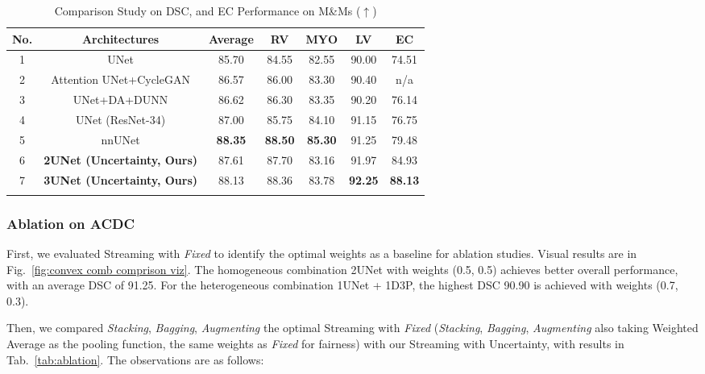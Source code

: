 \begin{table}[htb!]
\caption{Comparison Study on DSC, and EC Performance on M\&Ms ($\uparrow$)}
\centering
\begin{tabular}{ccccccc}
\toprule
No. & Architectures & Average & RV & MYO & LV & EC \\ 
\midrule
1 & UNet \cite{saber2021multi}    
& 85.70 & 84.55 & 82.55 & 90.00 & 74.51\\ 
2 & Attention UNet+CycleGAN \cite{kong2021generalizable} 
& 86.57 & 86.00 & 83.30 & 90.40 & n/a \\
3 & UNet+DA+DUNN \cite{corral20212}    
& 86.62 & 86.30 & 83.35 & 90.20 & 76.14\\ 
4 & UNet (ResNet-34) \cite{parreno2021deidentifying}  
& 87.00 & 85.75 & 84.10 & 91.15 & 76.75 \\ 
5 & nnUNet \cite{full2021studying}     
& \textbf{88.35} & \textbf{88.50} & \textbf{85.30} & 91.25 & 79.48\\ 

\midrule
6 & \textbf{2UNet (Uncertainty, Ours)}  
&87.61 & 87.70 & 83.16 & 91.97 &84.93 \\ 
7 & \textbf{3UNet (Uncertainty, Ours)}  
&88.13 & 88.36 & 83.78 & \textbf{92.25} &\textbf{88.13} \\ 
\bottomrule
\label{tab:comparison_mm}
\end{tabular}
\end{table}


\subsubsection{Ablation on ACDC}
\label{sec: ablation on ACDC}

First, we evaluated Streaming with \textit{Fixed} to identify the optimal weights as a baseline for ablation studies. Visual results are in Fig.~\ref{fig:convex comb comprison viz}. The homogeneous combination 2UNet with weights (0.5, 0.5) achieves better overall performance, with an average DSC of 91.25. For the heterogeneous combination 1UNet + 1D3P, the highest DSC 90.90 is achieved with weights (0.7, 0.3).

Then, we compared \textit{Stacking}, \textit{Bagging}, \textit{Augmenting} the optimal Streaming with \textit{Fixed} (\textit{Stacking}, \textit{Bagging}, \textit{Augmenting} also taking Weighted Average as the pooling function, the same weights as \textit{Fixed} for fairness) with our Streaming with Uncertainty, with results in Tab.~\ref{tab:ablation}. The observations are as follows:


